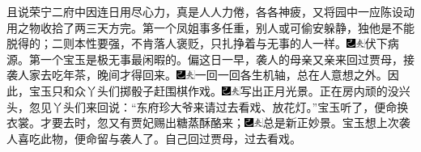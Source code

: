 且说荣宁二府中因连日用尽心力，真是人人力倦，各各神疲，又将园中一应陈设动用之物收拾了两三天方完。第一个凤姐事多任重，别人或可偷安躲静，独他是不能脱得的；二则本性要强，不肯落人褒贬，只扎挣着与无事的人一样。{\includegraphics[width=3mm]{../Images/00003}\includegraphics[width=3mm]{../Images/00012}\footnotesize \kaishu 伏下病源。}第一个宝玉是极无事最闲暇的。偏这日一早，袭人的母亲又亲来回过贾母，接袭人家去吃年茶，晚间才得回来。{\includegraphics[width=3mm]{../Images/00003}\includegraphics[width=3mm]{../Images/00012}\footnotesize \kaishu 一回一回各生机轴，总在人意想之外。}因此，宝玉只和众丫头们掷骰子赶围棋作戏。{\includegraphics[width=3mm]{../Images/00003}\includegraphics[width=3mm]{../Images/00012}\footnotesize \kaishu 写出正月光景。}正在房内顽的没兴头，忽见丫头们来回说：``东府珍大爷来请过去看戏、放花灯。''宝玉听了，便命换衣裳。才要去时，忽又有贾妃赐出糖蒸酥酪来；{\includegraphics[width=3mm]{../Images/00003}\includegraphics[width=3mm]{../Images/00012}\footnotesize \kaishu 总是新正妙景。}宝玉想上次袭人喜吃此物，便命留与袭人了。自己回过贾母，过去看戏。

